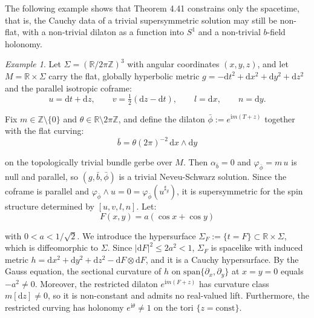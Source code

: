 \documentclass[10pt,reqno,a4paper]{amsart}
\theoremstyle{plain}
\theoremstyle{definition}
\theoremstyle{remark}
\newtheorem{example}[thm]{Example}
\theoremstyle{remark}
\def\dd{\mathrm{d}}
\renewcommand{\(}{ (}
\renewcommand{\)}{ )}
\begin{document}
The following example shows that Theorem 4.41 constrains only the spacetime, that is, the Cauchy data of a trivial supersymmetric solution may still be non-flat, with a non-trivial dilaton as a function into $S^1$ and a non-trivial $b$-field holonomy.

\begin{example}
Let $\Sigma = (\mathbb{R}/2\pi\mathbb{Z})^3$ with angular coordinates $(x,y,z)$, and let $M = \mathbb{R}\times\Sigma$ carry the flat, globally hyperbolic metric $g = -\dd t^2 + \dd x^2 + \dd y^2 + \dd z^2$ and the parallel isotropic coframe:
\begin{equation*}
u = \dd t + \dd z, \qquad v = \tfrac12 (\dd z - \dd t), \qquad
l = \dd x, \qquad n = \dd y.
\end{equation*}

\noindent
Fix $m \in \mathbb{Z}\setminus\{0\}$ and $\theta \in \mathbb{R}\setminus 2\pi\mathbb{Z}$, and define the dilaton $\bar\phi := e^{\mathrm{i}m(T+z)}$ together with the flat curving:
\begin{equation*}
 \bar b = \theta(2\pi)^{-2}\,\dd x\wedge\dd y   
\end{equation*}

\noindent
on the topologically trivial bundle gerbe over $M$. Then $\alpha_{\bar b} = 0$ and $\varphi_{\bar\phi} = m\,u$ is null and parallel, so $(g,\bar b,\bar\phi)$ is a trivial Neveu-Schwarz solution. Since the coframe is parallel and $\varphi_{\bar\phi}\wedge u = 0 = \varphi_{\bar\phi}(u^{\sharp_g})$, it is supersymmetric for the spin structure determined by $[u,v,l,n]$. Let:
\begin{equation*}
F(x,y) = a(\cos x + \cos y)    
\end{equation*}

\noindent
with $0 < a < 1/\sqrt2$. We introduce the hypersurface $\Sigma_F := \{t = F\}\subset \mathbb{R} \times \Sigma$, which is diffeomorphic to $\Sigma$. Since $|\dd F|^2 \le 2a^2 < 1$, $\Sigma_F$ is spacelike with induced metric $h = \dd x^2 + \dd y^2 + \dd z^2 - \dd F \otimes \dd F$, and it is a Cauchy hypersurface. By the Gauss equation, the sectional curvature of $h$ on $\mathrm{span}\{\partial_x,\partial_y\}$ at $x = y = 0$ equals $-a^2 \neq 0$. Moreover, the restricted dilaton $e^{\mathrm{i}m(F+z)}$ has curvature class $m[\dd z] \neq 0$, so it is non-constant and admits no real-valued lift. Furthermore, the restricted curving has holonomy $e^{\mathrm{i}\theta} \neq 1$ on the tori $\{z = \mathrm{const}\}$.
\end{example}
\end{document}
